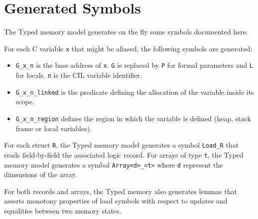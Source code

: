 \section{Generated Symbols}

The \textsf{Typed} memory model generates on the fly some symbols
documented here.

For each \textsf{C} variable \texttt{x} that might be aliased, the
following symbols are generated:
\begin{itemize}
\item \verb+G_x_n+ is the base address of \verb+x+. \verb+G+ is replaced by
  \verb+P+ for formal parameters and \verb+L+ for locals. \verb+n+ is
  the \textsf{CIL} variable identifier.
\item \verb+G_x_n_linked+ is the predicate defining the allocation
  of the variable inside its scope.
\item \verb+G_x_n_region+ defines the region in which the variable is defined
  (heap, stack frame or local variables).
\end{itemize}

For each struct \verb+R+, the \textsf{Typed} memory model generates a
symbol \verb+Load_R+ that reads field-by-field the associated logic
record. For arrays of type \verb+t+, the \textsf{Typed} memory model
generates a symbol \verb+Array<d>_<t>+ where \verb+d+ represent the
dimensions of the array.

For both records and arrays, the \textsf{Typed} memory also generates
lemmas that asserts monotony properties of load symbols with respect
to updates and equalities between two memory states.

